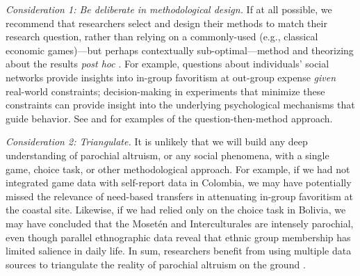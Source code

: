 \documentclass[bibauthoryear]{aa}
\begin{document}
\emph{Consideration 1: Be deliberate in methodological design.} If at all possible, we recommend that researchers select and design their methods to match their research question, rather than relying on a commonly-used (e.g., classical economic games)---but perhaps contextually sub-optimal---method and theorizing about the results \emph{post hoc} \citep{Pisor2020}. %
For example, questions about individuals' social networks provide insights into in-group favoritism at out-group expense \emph{given} real-world constraints; decision-making in experiments that minimize these constraints can provide insight into the underlying psychological mechanisms that guide behavior. See \citet{schaub2017threat} and \citet{yamagishi2016parochial} for examples of the question-then-method approach.

\emph{Consideration 2: Triangulate.} It is unlikely that we will build any deep understanding of parochial altruism, or any social phenomena, with a single game, choice task, or other methodological approach. For example, if we had not integrated game data with self-report data in Colombia, we may have potentially missed the relevance of need-based transfers in attenuating in-group favoritism at the coastal site. Likewise, if we had relied only on the choice task in Bolivia, we may have concluded that the Moset\'en and Interculturales are intensely parochial, even though parallel ethnographic data reveal that ethnic group membership has limited salience in daily life. In sum, researchers benefit from using multiple data sources to triangulate the reality of parochial altruism on the ground \citep{Friedman2004, Pisor2020, Naar2020, gurven2008collective}. %

\end{document}
